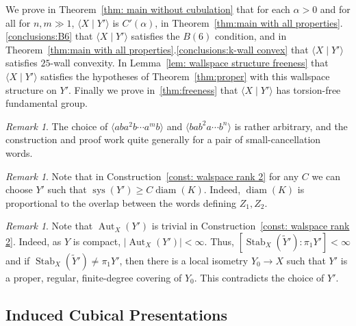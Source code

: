 \documentclass[12pt,oneside]{amsart}
\theoremstyle{definition}
\theoremstyle{definition}
\theoremstyle{remark}
\newtheorem{rem}[thm]{Remark}
\DeclareMathOperator{\diam}{\text{diam}}
\DeclareMathOperator{\sys}{\mathrm sys}
\DeclareMathOperator{\Aut}{Aut}
\DeclareMathOperator{\Stab}{Stab}
\begin{document}
We prove in Theorem~\ref{thm: main without cubulation} that for each $\alpha>0$ and  for all 
for $n,m\gg 1$,
$\langle X \mid Y'\rangle$ is $C'(\alpha)$,  in Theorem~\ref{thm:main with all properties}.\eqref{conclusions:B6} that  $\langle X \mid Y'\rangle$ satisfies  the  $B(6)$ condition, and in Theorem~\ref{thm:main with all properties}.\eqref{conclusions:k-wall convex} that $\langle X \mid Y'\rangle$ satisfies $25$-wall convexity. In Lemma~\ref{lem: wallspace structure freeness} that  $\langle X \mid Y'\rangle$ satisfies the hypotheses of Theorem~\ref{thm:proper} with this wallspace structure on $Y'$. Finally we prove in~\ref{thm:freeness} that 
 $\langle X \mid Y'\rangle$ has torsion-free fundamental group.

\begin{rem}
    The choice of 
    $\langle aba^2b\cdots a^mb \rangle$ and $\langle  bab^2a\cdots b^n\rangle$ is rather arbitrary, and the construction and proof work quite generally for a pair of small-cancellation words.
\end{rem}

\begin{rem}\label{rem:diam(K)}
    Note that in Construction~\ref{const: walspace rank 2} for any $C$ we can choose $Y'$ such that $\sys(Y')\geq C\diam(K)$. Indeed, $\diam(K)$ is proportional to the overlap between the words defining $Z_1, Z_2$.
\end{rem}


\begin{rem}\label{rem: trivial aut}
    Note that $\Aut_X(Y')$ is trivial in Construction~\ref{const: walspace rank 2}. Indeed, as $Y$ is compact, $|\Aut_X(Y')|< \infty$. Thus, $[\Stab_X(\widetilde Y'):\pi_1Y']< \infty$ and if $\Stab_X(\widetilde Y')\neq \pi_1Y'$, then there is a local isometry $Y_0 \rightarrow X$ such that $Y'$ is a proper, regular, finite-degree covering of  $Y_0$.  This contradicts the choice of $Y'$.
\end{rem}




\subsection{Induced Cubical Presentations}\label{subsec:induced}
\end{document}
